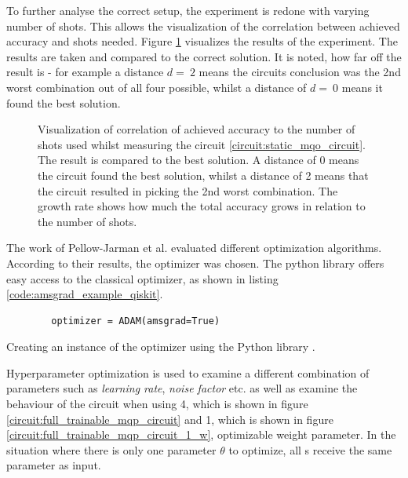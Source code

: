 To further analyse the correct setup, the experiment is redone with varying number of shots. This allows the visualization of the correlation between achieved accuracy and shots needed. Figure \ref{figure:correlation_accuracy_shots} visualizes the results of the experiment. The results are taken and compared to the correct solution. It is noted, how far off the result is - for example a distance $d =\ 2$ means the circuits conclusion was the 2nd worst combination out of all four possible, whilst a distance of $d =\ 0$ means it found the best solution.

\begin{figure}[!ht]
    \centering
    \scalebox{0.6}{
        
    }
    \caption{Visualization of correlation of achieved accuracy to the number of shots used whilst measuring the circuit \ref{circuit:static_mqo_circuit}. The result is compared to the best solution. A distance of 0 means the circuit found the best solution, whilst a distance of 2 means that the circuit resulted in picking the 2nd worst combination. The growth rate shows how much the total accuracy grows in relation to the number of shots.}
    \label{figure:correlation_accuracy_shots}
\end{figure}

\newpage

The work of Pellow-Jarman et al.\cite{pellow-jarman_comparison_2021} evaluated different optimization algorithms. According to their results, the  optimizer was chosen. The python library  offers easy access to the classical optimizer, as shown in listing \ref{code:amsgrad_example_qiskit}.

\begin{listing}[!h]
    \centering
    \begin{verbatim}
        optimizer = ADAM(amsgrad=True)
    \end{verbatim}
    \caption{Creating an instance of the  optimizer using the Python library .}
    \label{code:amsgrad_example_qiskit}
\end{listing}

Hyperparameter optimization is used to examine a different combination of parameters such as \emph{learning rate}, \emph{noise factor} etc. as well as examine the behaviour of the circuit when using 4, which is shown in figure \ref{circuit:full_trainable_mqp_circuit} and 1, which is shown in figure \ref{circuit:full_trainable_mqp_circuit_1_w}, optimizable weight parameter. In the situation where there is only one parameter $\theta$ to optimize, all \rxgate s receive the same parameter as input.

